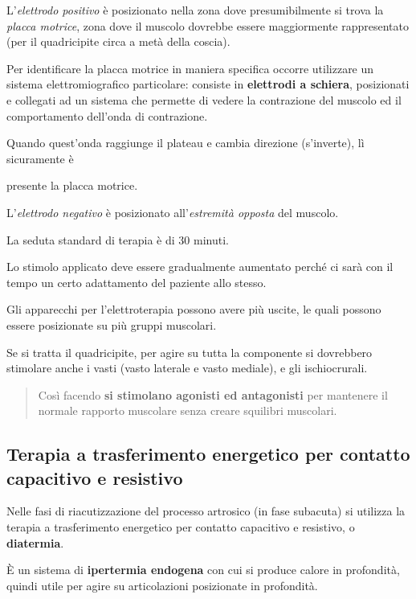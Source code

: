 \documentclass[]{article}
\begin{document}
L'\emph{elettrodo positivo} è posizionato nella zona dove
presumibilmente si trova la \emph{placca motrice}, zona dove il muscolo
dovrebbe essere maggiormente rappresentato (per il quadricipite circa a
metà della coscia).

Per identificare la placca motrice in maniera specifica occorre
utilizzare un sistema elettromiografico particolare: consiste in
\textbf{elettrodi a schiera}, posizionati e collegati ad un sistema che
permette di vedere la contrazione del muscolo ed il comportamento
dell'onda di contrazione.

Quando quest'onda raggiunge il plateau e cambia direzione (s'inverte),
lì sicuramente è

presente la placca motrice.

L'\emph{elettrodo negativo} è posizionato all'\emph{estremità opposta}
del muscolo.

La seduta standard di terapia è di 30 minuti.

Lo stimolo applicato deve essere gradualmente aumentato perché ci sarà
con il tempo un certo adattamento del paziente allo stesso.

Gli apparecchi per l'elettroterapia possono avere più uscite, le quali
possono essere posizionate su più gruppi muscolari.

Se si tratta il quadricipite, per agire su tutta la componente si
dovrebbero stimolare anche i vasti (vasto laterale e vasto mediale), e
gli ischiocrurali.

\begin{quote}
Così facendo \textbf{si stimolano agonisti ed antagonisti} per mantenere
il normale rapporto muscolare senza creare squilibri muscolari.
\end{quote}

\subsection{Terapia a trasferimento energetico per contatto capacitivo e
resistivo}\label{terapia-a-trasferimento-energetico-per-contatto-capacitivo-e-resistivo}

Nelle fasi di riacutizzazione del processo artrosico (in fase subacuta)
si utilizza la terapia a trasferimento energetico per contatto
capacitivo e resistivo, o \textbf{diatermia}.

È un sistema di \textbf{ipertermia endogena} con cui si produce calore
in profondità, quindi utile per agire su articolazioni posizionate in
profondità.
\end{document}
